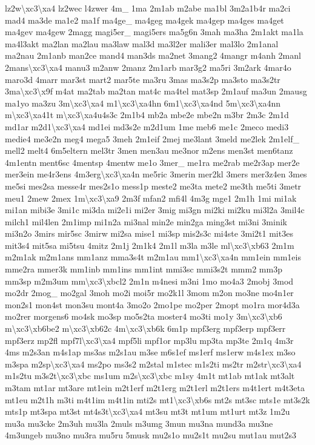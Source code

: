 {lz2w\textbackslash{}xc3\textbackslash{}xa4 lz2wec l4zwer 4m\-\_\- 1ma 2m1ab m2abe ma1bl 3m2a1b4r ma2ci mad4 ma3de ma1e2 ma1f ma4ge\-\_\- ma4geg ma4gek ma4gep ma4ges ma4get ma4gev ma4gew 2magg magi5er\-\_\- magi5ers ma5g6n 3mah ma3ha 2m1akt ma1la ma4l3akt ma2lan ma2lau ma3law mal3d ma3l2er mali3er mal3lo 2m1anal ma2nau 2m1anb man2ce mand4 man3ds ma2net 3mang2 4mangr m4anh 2manl 2mans\textbackslash{}xc3\textbackslash{}xa4 manu3 m2anw 2manz 2m1arb mar3g2 ma5ri 3m2ark 4mar4o maro3d 4marr mar3st mart2 mar5te ma3ru 3mas ma3s2p ma3sto ma3s2tr 3ma\textbackslash{}xc3\textbackslash{}x9f m4at ma2tab ma2tan mat4c ma4tel mat3sp 2m1auf ma3un 2mausg ma1yo ma3zu 3m\textbackslash{}xc3\textbackslash{}xa4 m1\textbackslash{}xc3\textbackslash{}xa4hn 6m1\textbackslash{}xc3\textbackslash{}xa4nd 5m\textbackslash{}xc3\textbackslash{}xa4nn m\textbackslash{}xc3\textbackslash{}xa41t m\textbackslash{}xc3\textbackslash{}xa4u4s3c 2m1b4 mb2a mbe2e mbe2n m3br 2m3c 2m1d md1ar m2d1\textbackslash{}xc3\textbackslash{}xa4 md1ei md3s2e m2d1um 1me meb6 me1c 2meco medi3 medie4 me3e2n meg4 mega5 3meh 2m1eif 2mej me3lant 3meld me2lek 2m1elf\-\_\- mell2 melt4 6m5eltern mel3tr 3men men3au me3nor m2ens men3st men6tanz 4m1entn ment6sc 4mentsp 4mentw me1o 3mer\-\_\- me1ra me2rab me2r3ap mer2e mer3ein me4r3ens 4m3erg\textbackslash{}xc3\textbackslash{}xa4n me5ric 3merin mer2kl 3mers mer3z4en 3mes me5si mes2sa messe4r mes2s1o mess1p meste2 me3ta mete2 me3th me5ti 3metr meu1 2mew 2mex 1m\textbackslash{}xc3\textbackslash{}xa9 2m3f mfan2 mfi4l 4m3g mge1 2m1h 1mi mi1ak mi1an mibi3e 3mi1c mi3da mi2e1i mi2er 3mig mi3gn mi2ki mi2ku mi3l2a 3mil4c milch1 mil4len 2m1imp mi1n2a mi3nal min2e min2ga ming3st mi3ni 3minik mi3n2o 3mirs mir5sc 3mirw mi2sa mise1 mi3sp mis2s3c mi4ste 3mi2t1 mit3es mit3s4 mit5sa mi5tsu 4mitz 2m1j 2m1k4 2m1l m3la m3le ml\textbackslash{}xc3\textbackslash{}xb63 2m1m m2m1ak m2m1ans mm1anz mma3s4t m2m1au mm1\textbackslash{}xc3\textbackslash{}xa4n mm1ein mm1eis mme2ra mmer3k mm1inb mm1ins mm1int mmi3sc mmi3s2t mmm2 mm3p mm3sp m2m3um mm\textbackslash{}xc3\textbackslash{}xbcl2 2m1n m4nesi m3ni 1mo mo4a3 2mobj 3mod mo2dr 2mog\-\_\- mo2gal 3moh mo2i moi5r mo2k1l 3mom m2on mo3ne mo4n1er mon2s1 mon4st mon3su mont4a 3mo2o 2mo1pe mo2per 2mopt mo1ra mor4d3a mo2rer morgens6 mo4sk mo3sp mo5s2ta moster4 mo3ti mo1y 3m\textbackslash{}xc3\textbackslash{}xb6 m\textbackslash{}xc3\textbackslash{}xb6be2 m\textbackslash{}xc3\textbackslash{}xb62c 4m\textbackslash{}xc3\textbackslash{}xb6k 6m1p mpf3erg mpf3erp mpf3err mpf3erz mp2fl mpf7l\textbackslash{}xc3\textbackslash{}xa4 mpf5li mpf1or mp3lu mp3ta mp3te 2m1q 4m3r 4ms m2s3an m4s1ap ms3as m2s1au m3se m6s1ef ms1erf ms1erw m4s1ex m3so m3spa m2sp\textbackslash{}xc3\textbackslash{}xa4 ms2po ms3s2 m2stal m1stec m1s2ti ms2tr m2str\textbackslash{}xc3\textbackslash{}xa4 m1s2tu m3s2t\textbackslash{}xc3\textbackslash{}xbc ms1um m2s\textbackslash{}xc3\textbackslash{}xbc m1sy 4m1t mt1ab mt1ak mt3alt m3tam mt1ar mt3are mt1ein m2t1erf m2t1erg m2t1erl m2t1ers m4t1ert m4t3eta mt1eu m2t1h m3ti m4t1im m4t1in mti2s mt1\textbackslash{}xc3\textbackslash{}xb6s mt2s mt3sc mts1e mt3s2k mts1p mt3spa mt3st mt4s3t\textbackslash{}xc3\textbackslash{}xa4 mt3su mt3t mt1um mt1urt mt3z 1m2u mu3a mu3cke 2m3uh mu3la 2muls m3umg 3mun mu3na mund3a mu3ne 4m3ungeb mu3no mu3ra mu5ru 5musk mu2s1o mu2s1t mu2su mut1au mut2s3 }
